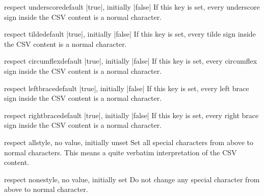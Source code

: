 \documentclass[a4paper,11pt]{ltxdoc}
\begin{document}
\begin{docCsvKey}{respect underscore}{}{default |true|, initially |false|}
  If this key is set, every
  underscore sign \verbbox{\_}
  inside the CSV content is a normal character.
\end{docCsvKey}

\begin{docCsvKey}{respect tilde}{}{default |true|, initially |false|}
  If this key is set, every
  tilde sign \verbbox{\textasciitilde}
  inside the CSV content is a normal character.
\end{docCsvKey}

\begin{docCsvKey}{respect circumflex}{}{default |true|, initially |false|}
  If this key is set, every
  circumflex sign \verbbox{\textasciicircum}
  inside the CSV content is a normal character.
\end{docCsvKey}

\begin{docCsvKey}{respect leftbrace}{}{default |true|, initially |false|}
  If this key is set, every
  left brace sign \verbbox{\textbraceleft}
  inside the CSV content is a normal character.
\end{docCsvKey}

\begin{docCsvKey}{respect rightbrace}{}{default |true|, initially |false|}
  If this key is set, every
  right brace sign \verbbox{\textbraceright}
  inside the CSV content is a normal character.
\end{docCsvKey}

\begin{docCsvKey}{respect all}{}{style, no value, initially unset}
  Set all special characters from above to normal characters. This means
  a quite verbatim interpretation of the CSV content.
\end{docCsvKey}

\begin{docCsvKey}{respect none}{}{style, no value, initially set}
  Do not change any special character from above to normal character.
\end{docCsvKey}

\clearpage
\end{document}

